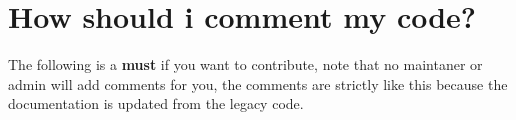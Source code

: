 \chapter{How should i comment my code?}
\hypertarget{md__2_users_2spirosmag_2_documents_2_algo_plus_2_c_o_m_m_e_n_t_s}{}\label{md__2_users_2spirosmag_2_documents_2_algo_plus_2_c_o_m_m_e_n_t_s}
\label{md__2_users_2spirosmag_2_documents_2_algo_plus_2_c_o_m_m_e_n_t_s_autotoc_md12}%
%
 The following is a {\bfseries{must}} if you want to contribute, note that no maintaner or admin will add comments for you, the comments are strictly like this because the documentation is updated from the legacy code.


\begin{DoxyCode}{0}
\DoxyCodeLine{}
\DoxyCodeLine{\}}

\end{DoxyCode}



\begin{DoxyCode}{0}
\DoxyCodeLine{}
\DoxyCodeLine{\}}

\end{DoxyCode}
 
